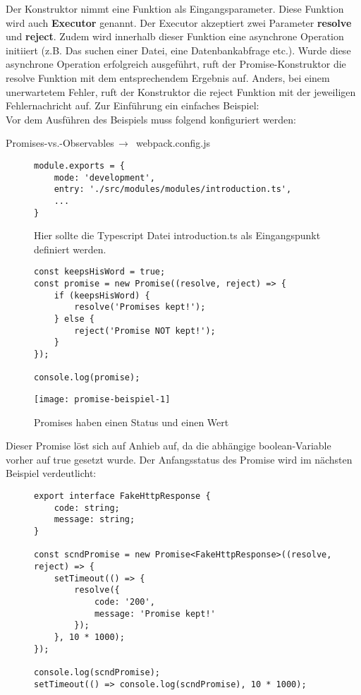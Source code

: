 Der Konstruktor nimmt eine Funktion als Eingangsparameter. Diese Funktion wird auch \textbf{Executor} genannt.\cite{promise-executor} Der Executor akzeptiert zwei Parameter \textbf{resolve} und \textbf{reject}. Zudem wird innerhalb dieser Funktion eine asynchrone Operation initiiert (z.B. Das suchen einer Datei, eine Datenbankabfrage etc.). Wurde diese asynchrone Operation erfolgreich ausgeführt, ruft der Promise-Konstruktor die resolve Funktion mit dem entsprechendem Ergebnis auf. Anders, bei einem unerwartetem Fehler, ruft der Konstruktor die reject Funktion mit der jeweiligen Fehlernachricht auf. Zur Einführung ein einfaches Beispiel:\\

\noindent
Vor dem Ausführen des Beispiels muss folgend konfiguriert werden:

 \begin{center}
     Promises-vs.-Observables$\,\to\,$ webpack.config.js
 \end{center}

\begin{figure}[H]
\begin{lstlisting}
module.exports = {
    mode: 'development',
    entry: './src/modules/modules/introduction.ts',
    ...
}
\end{lstlisting}
\caption{Hier sollte die Typescript Datei introduction.ts als Eingangspunkt definiert werden.}
\end{figure}

\begin{figure}[H]
\begin{lstlisting}
const keepsHisWord = true;
const promise = new Promise((resolve, reject) => {
    if (keepsHisWord) {
        resolve('Promises kept!');
    } else {
        reject('Promise NOT kept!');
    }
});

console.log(promise);
\end{lstlisting}
\end{figure}


\begin{figure}[H]
\centering
\texttt{[image: promise-beispiel-1]}
\caption{Promises haben einen Status und einen Wert}
\end{figure}

\noindent
Dieser Promise löst sich auf Anhieb auf, da die abhängige boolean-Variable vorher auf true gesetzt wurde. Der Anfangsstatus des Promise wird im nächsten Beispiel verdeutlicht:

\begin{figure}[H]
\begin{lstlisting}
export interface FakeHttpResponse {
    code: string;
    message: string;
}

const scndPromise = new Promise<FakeHttpResponse>((resolve, reject) => {
    setTimeout(() => {
        resolve({
            code: '200',
            message: 'Promise kept!'
        });
    }, 10 * 1000);
});

console.log(scndPromise);
setTimeout(() => console.log(scndPromise), 10 * 1000);
\end{lstlisting}
\end{figure}

